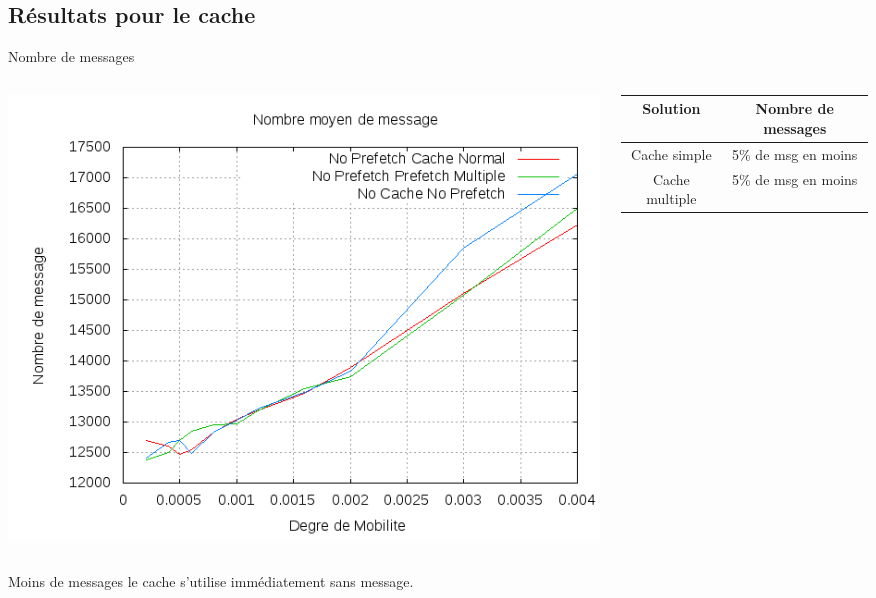 \documentclass{beamer}
\begin{document}
  \subsection{Résultats pour le cache}
  \begin{frame}
	\begin{center}
	Nombre de messages 
	\end{center}
	\begin{columns}
         \begin{column}{5cm}
          \includegraphics[scale=0.25]{./Ressources/Images/Courbes_Final_Rapport/Nombre_Messages_Caches.png}\\
         \end{column}
         \begin{column}{5cm}
	\footnotesize{ \begin{table}[!h]
                \begin{center}
                \begin{tabular}{|c|c|}
                \hline
                Solution & Nombre de messages \\
                \hline
                Cache simple &  5\% de msg en moins\\
                Cache multiple &  5\% de msg en moins\\
                \hline
                \end{tabular}
                \end{center}
        \end{table}}
         \end{column}
        \end{columns}
        \begin{itemize}\footnotesize{
                \item Moins de messages le cache s'utilise immédiatement sans message.
        }
        \end{itemize}
  \end{frame}
\end{document}
